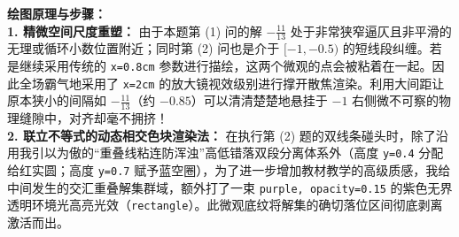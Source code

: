 \vspace{0.4cm}
{\small\color{blue!70!black}
\textbf{绘图原理与步骤：}\\
\textbf{1. 精微空间尺度重塑：} 由于本题第 (1) 问的解 $-\frac{11}{13}$ 处于非常狭窄逼仄且非平滑的无理或循环小数位置附近；同时第 (2) 问也是介于 $[-1, -0.5)$ 的短线段纠缠。若是继续采用传统的 \texttt{x=0.8cm} 参数进行描绘，这两个微观的点会被粘着在一起。因此全场霸气地采用了 \texttt{x=2cm} 的放大镜视效级别进行撑开散焦渲染。利用大间距让原本狭小的间隔如 $-\frac{11}{13}$（约 $-0.85$）可以清清楚楚地悬挂于 $-1$ 右侧微不可察的物理缝隙中，对齐却毫不拥挤！\\
\textbf{2. 联立不等式的动态相交色块渲染法：} 在执行第 (2) 题的双线条碰头时，除了沿用我引以为傲的“重叠线粘连防浑浊”高低错落双段分离体系外（高度 \texttt{y=0.4} 分配给红实圆；高度 \texttt{y=0.7} 赋予蓝空圈），为了进一步增加教材教学的高级质感，我给中间发生的交汇重叠解集群域，额外打了一束 \texttt{purple, opacity=0.15} 的紫色无界透明环境光高亮光效（\texttt{rectangle}）。此微观底纹将解集的确切落位区间彻底剥离激活而出。
}

\newpage
